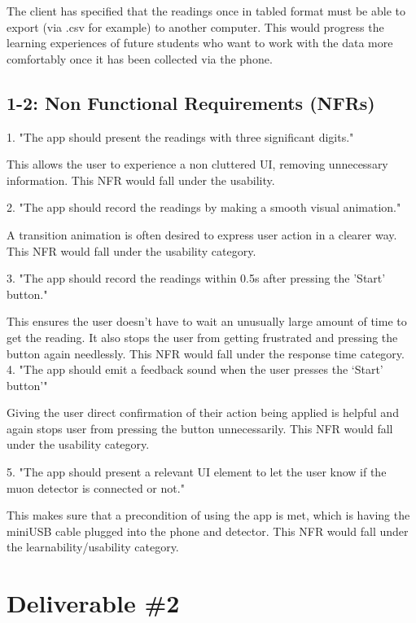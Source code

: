 \documentclass[11pt,a4paper]{article}
\begin{document}
The client has specified that the readings once in tabled format must be able to export (via .csv for example) to another computer. This would progress the learning experiences of future students who want to work with the data more comfortably once it has been collected via the phone.  

\subsection*{1-2: Non Functional Requirements (NFRs)}

1. "The app should present the readings with three significant digits."

This allows the user to experience a non cluttered UI, removing unnecessary information. This NFR would fall under the usability. 

\vskip 4mm

2. "The app should record the readings by making a smooth visual animation."

A transition animation is often desired to express user action in a clearer way. This NFR would fall under the usability category. 

\vskip 4mm

3. "The app should record the readings within 0.5s after pressing the 'Start' button."

This ensures the user doesn't have to wait an unusually large amount of time to get the reading. It also stops the user from getting frustrated and pressing the button again needlessly. This NFR would fall under the response time category. 
\vskip 4mm
4. "The app should emit a feedback sound when the user presses the ‘Start' button’" 

Giving the user direct confirmation of their action being applied is helpful and again stops user from pressing the button unnecessarily. This NFR would fall under the usability category.

\vskip 4mm
5. "The app should present a relevant UI element to let the user know if the muon detector is connected or not."

This makes sure that a precondition of using the app is met, which is having the miniUSB cable plugged into the phone and detector. This NFR would fall under the learnability/usability category.



\newpage 
\section*{Deliverable \#2}
\end{document}
